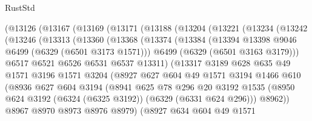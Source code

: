 \begin{lexlean}{RustStd}
\begin{coremodule}
{{    (@13126
      (@13167
        (@13169
          (@13171
            (@13188
              (@13204
                (@13221
                  (@13234
                    (@13242
                      (@13246
                        (@13313
                          (@13360
                            (@13368
                              (@13374
                                (@13384
                                  (@13394 @13398 @9046 @6499 (@6329 (@6501 @3173 @1571)))
                                  @6499
                                  (@6329 (@6501 @3163 @3179)))
                                @6517
                                @6521
                                @6526
                                @6531
                                @6537
                                @13311)
                              (@13317
                                @3189
                                @628
                                @635
                                @49
                                @1571
                                @3196
                                @1571
                                @3204
                                (@8927
                                  @627
                                  @604
                                  @49
                                  @1571
                                  @3194
                                  @1466
                                  @610
                                  (@8936
                                    @627
                                    @604
                                    @3194
                                    (@8941
                                      @625
                                      @78
                                      @296
                                      @20
                                      @3192
                                      @1535
                                      (@8950
                                        @624
                                        @3192
                                        (@6324 (@6325 @3192))
                                        (@6329 (@6331 @624 @296)))
                                      @8962))
                                  @8967
                                  @8970
                                  @8973
                                  @8976
                                  @8979)
                                (@8927
                                  @634
                                  @604
                                  @49
                                  @1571
}}
\end{coremodule}
\end{lexlean}
